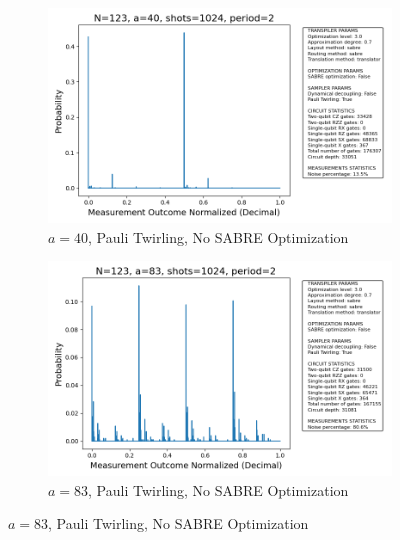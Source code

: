 \documentclass[conference,twoside]{IEEEtran}
\begin{document}
\begin{figure}[!htbp]
    \begin{subfigure}{0.37\textwidth}
        \centering
        \includegraphics[width=\textwidth]{prob_dist_N123_a40_backend_ibmqpu_PT1_SO0.png}
        \caption{$a=40$, Pauli Twirling, No SABRE Optimization}
    \end{subfigure}
    \hfill
    \begin{subfigure}{0.37\textwidth}
        \centering
        \includegraphics[width=\textwidth]{prob_dist_N123_a83_backend_ibmqpu_PT1_SO0.png}
        \caption{$a=83$, Pauli Twirling, No SABRE Optimization}
    \end{subfigure}

    \vspace{0pt}


\end{figure}
\end{document}
